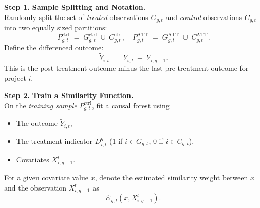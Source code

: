 \documentclass[source/paper/main.tex]{subfiles}
\begin{document}
\noindent\textbf{Step 1. Sample Splitting and Notation.}\\
Randomly split the set of \emph{treated} observations $G_{g,t}$ and \emph{control} observations $C_{g,t}$ into two equally sized partitions:
\[
  P_{g,t}^{\mathrm{ctrl}} 
  \;=\; 
  G_{g,t}^{\mathrm{ctrl}} 
  \;\cup\; 
  C_{g,t}^{\mathrm{ctrl}},
  \quad
  P_{g,t}^{\mathrm{ATT}}
  \;=\;
  G_{g,t}^{\mathrm{ATT}} 
  \;\cup\; 
  C_{g,t}^{\mathrm{ATT}}.
\]
Define the differenced outcome:
\[
  \tilde{Y}_{i,t} 
  \;=\; 
  Y_{i,t} \;-\; Y_{i,g-1}.
\]
This is the post‐treatment outcome minus the last pre‐treatment outcome for project $i$.


\noindent\textbf{Step 2. Train a Similarity Function.}\\
On the \emph{training sample} $P_{g,t}^{\mathrm{ctrl}}$, fit a causal forest using
\begin{itemize}
\item The outcome $\tilde{Y}_{i,t}$,
\item The treatment indicator $D_{i,t}^g$ (1 if $i \in G_{g,t}$, 0 if $i \in C_{g,t}$),
\item Covariates $X_{i,g-1}^t$.
\end{itemize}
For a given covariate value $x$, denote the estimated similarity weight between $x$ and the observation $X_{i,g-1}^t$ as 
\[
  \widehat{\alpha}_{g,t}(x, X_{i,g-1}^t).
\]
\end{document}
